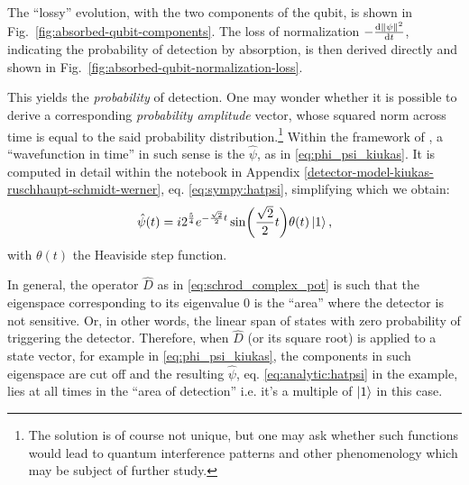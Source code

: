 The ``lossy'' evolution, with the two components of the qubit, is shown in Fig.~\ref{fig:absorbed-qubit-components}.
The loss of normalization $-\dv{\norm{\psi}^2}{t}$, indicating the probability of detection by absorption,
is then derived directly and shown in Fig.~\ref{fig:absorbed-qubit-normalization-loss}.

This yields the \emph{probability} of detection.
One may wonder whether it is possible to derive a corresponding \emph{probability amplitude} vector,
whose squared norm across time is equal to the said probability distribution.\footnote{
  The solution is of course not unique, but one may ask whether such functions would lead
  to quantum interference patterns and other phenomenology which may be subject of further study.
}
Within the framework of \cite{RuschhauptAbsorption}, a ``wavefunction in time'' in such sense
is the $\hat{\psi}$, as in \eqref{eq:phi_psi_kiukas}.
It is computed in detail within the
notebook in Appendix \ref{detector-model-kiukas-ruschhaupt-schmidt-werner}, eq. \eqref{eq:sympy:hatpsi},
simplifying which we obtain:
\begin{equation}\label{eq:analytic:hatpsi}
  \hat{\psi}(t) =
    i 2^{\frac{5}{4}} e^{-\frac{\sqrt{2}}{2}t}\sin(\frac{\sqrt{2}}{2}t) \theta(t)
    \ket{1}
    \text{,}
\end{equation}
with $\theta(t)$ the Heaviside step function.

In general, the operator $\hat{D}$ as in \eqref{eq:schrod_complex_pot}
is such that the eigenspace corresponding to its eigenvalue $0$
is the ``area'' where the detector is not sensitive. Or, in other words,
the linear span of states with zero probability of triggering the detector.
Therefore, when $\hat{D}$ (or its square root) is applied to a state vector,
for example in \eqref{eq:phi_psi_kiukas},
the components in such eigenspace are cut off and the resulting
$\hat{\psi}$, eq. \eqref{eq:analytic:hatpsi} in the example, lies at all times in the ``area of detection''
i.e. it's a multiple of $\ket{1}$ in this case.